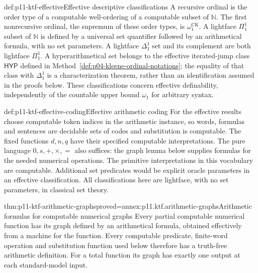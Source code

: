 \begin{hbdefinition}{def:p11-ktf-effective}{Effective descriptive classifications}
A recursive ordinal is the order type of a computable well-ordering of a
computable subset of \(\mathbb N\). The first nonrecursive ordinal,
the supremum of these order types, is \(\omega_1^{\mathrm{CK}}\).
A lightface \(\Pi^1_1\) subset of \(\mathbb N\) is defined by a
universal set quantifier followed by an arithmetical formula, with no set
parameters. A lightface \(\Delta^1_1\) set and its complement are
both lightface \(\Pi^1_1\). A hyperarithmetical set belongs to
the effective iterated-jump class \(\mathsf{HYP}\) defined in
Method~\ref{def:p04-kleene-ordinal-notations}; the equality of that
class with \(\Delta^1_1\) is a characterization theorem, rather
than an identification assumed in the proofs below.
These classifications concern effective definability, independently of
the countable upper bound \(\omega_1\) for arbitrary syntax.
\end{hbdefinition}

\begin{hbconvention}{def:p11-ktf-effective-coding}{Effective arithmetic coding}
For the effective results choose computable token indices in the arithmetic
instance, so words, formulas and sentences are decidable sets of codes and
substitution is computable. The fixed functions \(d,n,q\) have their
specified computable interpretations. The pure language
\(0,s,+,\times,=\) also suffices: the graph lemma below supplies
formulas for the needed numerical operations. The primitive
interpretations in this vocabulary are computable. Additional
set predicates would be explicit oracle parameters in an effective
classification. All classifications here are
lightface, with no set parameters, in classical set theory.
\end{hbconvention}

\begin{hblemma}{thm:p11-ktf-arithmetic-graphs}{proved=annex:p11.ktf.arithmetic-graphs}{Arithmetic formulas for computable numerical graphs}
Every partial computable numerical function has its graph defined by an
arithmetical formula, obtained effectively from a machine for the function.
Every computable predicate, finite-word operation and substitution function
used below therefore has a truth-free arithmetic definition. For a total
function its graph has exactly one output at each standard-model input.
\end{hblemma}

